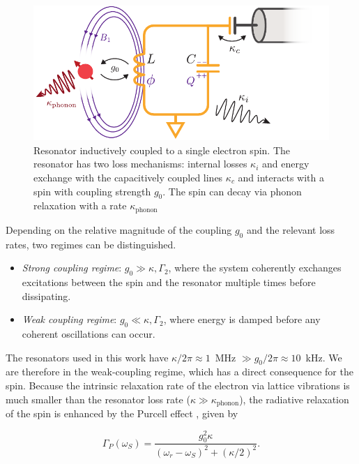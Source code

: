 \begin{figure}
    \includegraphics{chapter2/figures/resonator_spin_lines.pdf}
    \caption[Resonator coupled to a spin]{Resonator inductively coupled to a single electron spin. The resonator has two loss mechanisms: internal losses $\kappa_i$ and energy exchange with the capacitively coupled lines $\kappa_c$ and interacts with a spin with coupling strength $g_0$. The spin can decay via phonon relaxation with a rate $\kappa_\text{phonon}$}
\end{figure}

Depending on the relative magnitude of the coupling $g_0$ and the relevant loss rates, two regimes can be distinguished.

\begin{itemize}
    \item \textit{Strong coupling regime}: $g_0 \gg \kappa, \Gamma_2$, where the system coherently exchanges excitations between the spin and the resonator multiple times before dissipating.
    \item \textit{Weak coupling regime}: $g_0 \ll \kappa, \Gamma_2$, where energy is damped before any coherent oscillations can occur.
\end{itemize}

The resonators used in this work have $\kappa/2\pi \approx 1$~MHz $\gg g_0/2\pi \approx 10$~kHz. We are therefore in the weak-coupling regime, which has a direct consequence for the \Er spin. Because the intrinsic relaxation rate of the electron via lattice vibrations is much smaller than the resonator loss rate ($\kappa \gg \kappa_\text{phonon}$), the radiative relaxation of the spin is enhanced by the Purcell effect , given by

\begin{equation}
    \Gamma_{P}(\omega_S) = \frac{g_0^2\kappa}{(\omega_r-\omega_S)^2 + (\kappa/2)^2}.
\end{equation}


